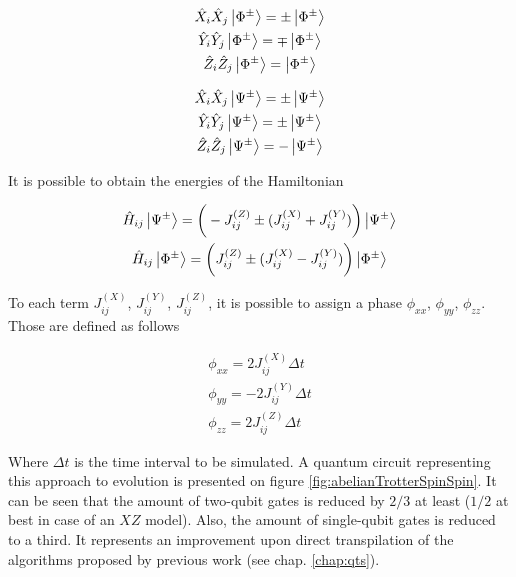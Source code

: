   \begin{gather}
    \hat{X}_i\hat{X}_j \ket{\Phi^{\pm}} = \pm\ket{\Phi^{\pm}} \\
    \hat{Y}_i\hat{Y}_j \ket{\Phi^{\pm}} = \mp\ket{\Phi^{\pm}} \\
    \hat{Z}_i\hat{Z}_j \ket{\Phi^{\pm}} = \ket{\Phi^{\pm}}
    \label{eq:PhiBellBasisOps}
  \end{gather}

  \begin{gather}
    \hat{X}_i\hat{X}_j \ket{\Psi^{\pm}} = \pm\ket{\Psi^{\pm}} \\
    \hat{Y}_i\hat{Y}_j \ket{\Psi^{\pm}} = \pm\ket{\Psi^{\pm}} \\
    \hat{Z}_i\hat{Z}_j \ket{\Psi^{\pm}} = -\ket{\Psi^{\pm}}
    \label{eq:PsiBellBasisOps}
  \end{gather}

  It is possible to obtain the energies of the Hamiltonian

  \begin{gather}
    \hat{H}_{ij} \ket{\Psi^{\pm}} = \bigg(-J_{ij}^{(Z)} \pm (J_{ij}^{(X)} + J_{ij}^{(Y)})\bigg) \ket{\Psi^{\pm}} \\
    \hat{H}_{ij} \ket{\Phi^{\pm}} = \bigg(J_{ij}^{(Z)} \pm (J_{ij}^{(X)} - J_{ij}^{(Y)})\bigg) \ket{\Phi^{\pm}}
    \label{eq:SpinSpinEnergies}
  \end{gather}

  To each term $J_{ij}^{(X)}$, $J_{ij}^{(Y)}$, $J_{ij}^{(Z)}$, it is possible to assign a phase $\phi_{xx}$, $\phi_{yy}$, $\phi_{zz}$. Those are defined as follows

  \begin{gather}
    \phi_{xx} = 2 J_{ij}^{(X)} \Delta t \\
    \phi_{yy} = -2 J_{ij}^{(Y)} \Delta t \\
    \phi_{zz} = 2 J_{ij}^{(Z)} \Delta t
    \label{eq:SpinSpinPhases}
  \end{gather}
  
  Where $\Delta t$ is the time interval to be simulated. A quantum circuit representing this approach to evolution is presented on figure \ref{fig:abelianTrotterSpinSpin}. It can be seen that the amount of two-qubit gates is reduced by $2/3$ at least ($1/2$ at best in case of an $XZ$ model). Also, the amount of single-qubit gates is reduced to a third. It represents an improvement upon direct transpilation of the algorithms proposed by previous work (see chap. \ref{chap:qts}).

  

